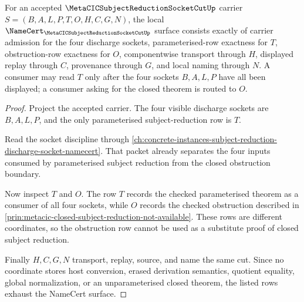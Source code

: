 \begin{theorem}
\label{thm:metacic-subject-reduction-socket-cut-namecert-obligations}
For an accepted $\MetaCICSubjectReductionSocketCutUp$ carrier $S=(B,A,L,P,T,O,H,C,G,N)$, the local $\NameCert_{\MetaCICSubjectReductionSocketCutUp}$ surface consists exactly of carrier admission for the four discharge sockets, parameterised-row exactness for $T$, obstruction-row exactness for $O$, componentwise transport through $H$, displayed replay through $C$, provenance through $G$, and local naming through $N$. A consumer may read $T$ only after the four sockets $B,A,L,P$ have all been displayed; a consumer asking for the closed theorem is routed to $O$.
\end{theorem}
\begin{proof}
Project the accepted carrier. The four visible discharge sockets are $B,A,L,P$, and the only parameterised subject-reduction row is $T$.

Read the socket discipline through \autoref{ch:concrete-instances-subject-reduction-discharge-socket-namecert}. That packet already separates the four inputs consumed by parameterised subject reduction from the closed obstruction boundary.

Now inspect $T$ and $O$. The row $T$ records the checked parameterised theorem as a consumer of all four sockets, while $O$ records the checked obstruction described in \autoref{prin:metacic-closed-subject-reduction-not-available}. These rows are different coordinates, so the obstruction row cannot be used as a substitute proof of closed subject reduction.

Finally $H,C,G,N$ transport, replay, source, and name the same cut. Since no coordinate stores host conversion, erased derivation semantics, quotient equality, global normalization, or an unparameterised closed theorem, the listed rows exhaust the NameCert surface.
\end{proof}

